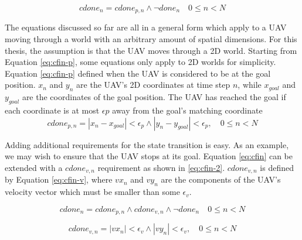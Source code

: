 \begin{equation}
\label{eq:cfin}
cdone_n =  cdone_{p,n} \wedge \neg done_n\quad 0 \leq n < N
\end{equation}

The equations discussed so far are all in a general form which apply to a UAV moving through a world with an arbitrary amount of spatial dimensions. For this thesis, the assumption is that the UAV moves through a 2D world. Starting from Equation \ref{eq:cfin-p}, some equations only apply to 2D worlds for simplicity. \\
Equation \ref{eq:cfin-p} defined when the UAV is considered to be at the goal position. $x_n$ and $y_n$ are the UAV's 2D coordinates at time step $n$, while $x_{goal}$ and $y_{goal}$ are the coordinates of the goal position. The UAV has reached the goal if each coordinate is at most $\epsilon{p}$ away from the goal's matching coordinate
\begin{equation}
\label{eq:cfin-p}
cdone_{p,n} = |x_{n} - x_{goal}| < \epsilon_{p} \wedge  |y_{n} - y_{goal}| < \epsilon_{p}, \quad 0 \leq n < N
\end{equation}

Adding additional requirements for the state transition is easy. As an example, we may wish to ensure that the UAV stops at its goal. Equation \ref{eq:cfin} can be extended with a $cdone_{v,n}$ requirement as shown in \ref{eq:cfin-2}. $cdone_{v,n}$ is defined by Equation \ref{eq:cfin-v}, where $vx_n$ and $vy_n$ are the components of the UAV's velocity vector which must be smaller than some $\epsilon_v$.

\begin{equation}
\label{eq:cfin-2}
cdone_n =  cdone_{p,n} \wedge cdone_{v,n} \wedge \neg done_n\quad 0 \leq n < N
\end{equation}

\begin{equation}
\label{eq:cfin-v}
cdone_{v,n} = |vx_{n}| < \epsilon_{v} \wedge  |vy_{n}| < \epsilon_{v}, \quad 0 \leq n < N
\end{equation}
